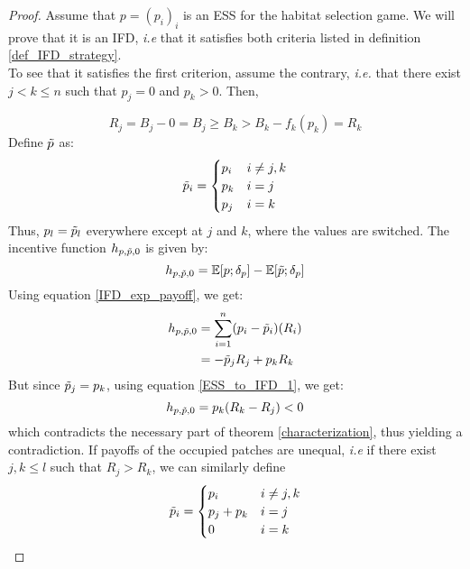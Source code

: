 \begin{proof}
	Assume that $p= (p_i)_i$ is an ESS for the habitat selection game. We will prove that it is an IFD, \textit{i.e} that it satisfies both criteria listed in  definition \ref{def_IFD_strategy}.\\
	To see that it satisfies the first criterion, assume the contrary, \textit{i.e.} that there exist $j < k \leq n$ such that $p_j = 0$ and $p_k > 0$. Then, 
	
	\begin{equation}
		\label{ESS_to_IFD_1}
		R_j = B_j - 0 = B_j \geq B_k > B_k - f_k(p_k) = R_k
	\end{equation}
	Define $\Tilde{p}$ as:
	\begin{equation*}
		\Tilde{p}_i = \begin{cases}
			p_i & i \neq j,k \\
			p_k & i = j\\
			p_j & i = k
		\end{cases}
	\end{equation*}
	Thus, $p_l = \Tilde{p}_l$ everywhere except at $j$ and $k$, where the values are switched. The incentive function $h_{p,\Tilde{p},0}$ is given by:
	\begin{equation*}
		h_{p,\Tilde{p},0} = \mathbb{E}[p;\delta_p] - \mathbb{E}[\Tilde{p};\delta_p]
	\end{equation*}
	Using equation \eqref{IFD_exp_payoff}, we get:
	\begin{align*}
		h_{p,\Tilde{p},0} &= \sum\limits_{i=1}^{n}(p_i-\Tilde{p}_i)(R_i)\\
		&= -\Tilde{p}_jR_j + p_kR_k\\
	\end{align*}
	But since $\Tilde{p}_j = p_k$, using equation \eqref{ESS_to_IFD_1}, we get:
	\begin{equation*}
		h_{p,\Tilde{p},0} = p_k(R_k-R_j) < 0
	\end{equation*}
	which contradicts the necessary part of theorem \ref{characterization}, thus yielding a contradiction. If payoffs of the occupied patches are unequal, \textit{i.e} if there exist $j,k \leq l$ such that $R_j > R_k$, we can similarly define
	\begin{equation*}
		\Tilde{p}_i = \begin{cases}
			p_i & i \neq j,k \\
			p_j + p_k & i = j\\
			0 & i = k
		\end{cases}
	\end{equation*}

\end{proof}
